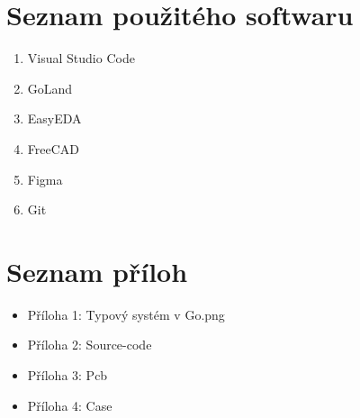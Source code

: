 \documentclass[czech,12pt,a4paper]{article}
\begin{document}
\clearpage

\section{Seznam použitého softwaru} \label{secSoftware}

\begin{enumerate}
	\item Visual Studio Code
	\item GoLand
	\item EasyEDA
	\item FreeCAD
	\item Figma
	\item Git
\end{enumerate}

\clearpage

\section{Seznam příloh} \label{secSeznamPriloh}

\begin{itemize}
	\item Příloha 1: Typový systém v Go.png
	\item Příloha 2: Source-code
	\item Příloha 3: Pcb
	\item Příloha 4: Case
\end{itemize}
\end{document}
